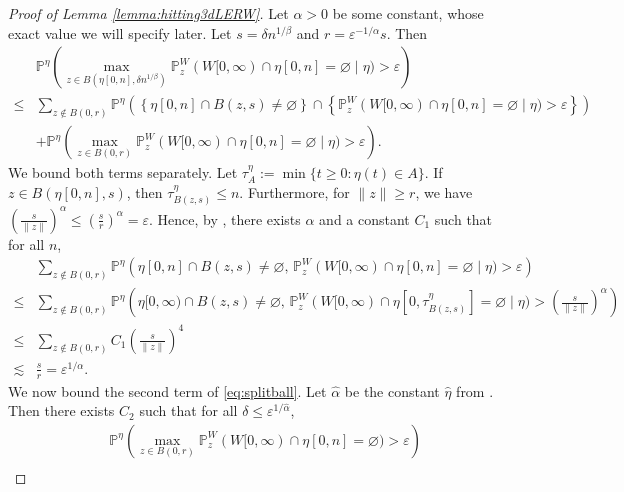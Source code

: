 \documentclass{article}
\renewcommand{\P}{\mathbb{P}}
\newcommand{\1}{\mathbf{1}}
\theoremstyle{definition}
\numberwithin{equation}{section}
\numberwithin{theorem}{section}
\begin{document}
\begin{proof}[Proof of Lemma \ref{lemma:hitting3dLERW}]
Let $\alpha>0$ be some constant, whose exact value we will specify later. Let $s=\delta n^{1/\beta}$ and $r=\varepsilon^{-1/\alpha}s$. Then
\begin{equation}\label{eq:splitball}
    \begin{split}
        &\P^\eta\left(\max_{z\in B(\eta[0,n],\delta n^{1/\beta})}\P^W_z(W[0,\infty)\cap \eta[0,n]=\varnothing\mid \eta)>\varepsilon\right)\\
        \leq&\sum_{z\not\in B(0,r)}\P^\eta\left(\left\{\eta[0,n]\cap B(z,s)\neq\varnothing\right\}\cap\left\{\P^W_z(W[0,\infty)\cap \eta[0,n]=\varnothing\mid \eta)>\varepsilon\right\}\right)\\
        &+\P^\eta\left(\max_{z\in B(0,r)}\P^W_z(W[0,\infty)\cap \eta[0,n]=\varnothing\mid \eta)>\varepsilon\right).
    \end{split}
\end{equation}
We bound both terms separately. Let $\tau^\eta_A:=\min\{t\geq0\colon \eta(t)\in A\}$. If $z\in B(\eta[0,n],s)$, then $\tau^\eta_{B(z,s)}\leq n$. Furthermore, for $\|z\|\geq r$, we have $(\frac{s}{\|z\|})^{\alpha}\leq(\frac{s}{r})^{\alpha}=\varepsilon$. Hence, by \cite[Lemma 3.3]{sapozhnikov18brownian}, there exists $\alpha$ and a constant $C_1$ such that for all $n$,
\begin{equation}\label{eq:firstterm}
    \begin{split}
        &\sum_{z\not\in B(0,r)}\P^\eta\left(\eta[0,n]\cap B(z,s)\neq\varnothing,\,\P^W_z(W[0,\infty)\cap \eta[0,n]=\varnothing\mid \eta)>\varepsilon\right)\\
        \leq&\sum_{z\not\in B(0,r)}\P^\eta\left(\eta[0,\infty)\cap B(z,s)\neq\varnothing,\,\P^W_z(W[0,\infty)\cap \eta[0,\tau^{\eta}_{B(z,s)}]=\varnothing\mid \eta)>(\tfrac{s}{\|z\|})^{\alpha}\right)\\
        \leq&\sum_{z\not\in B(0,r)} C_1\left(\frac{s}{\|z\|}\right)^{4}\\
        \lesssim&\frac{s}{r}=\varepsilon^{1/\alpha}.
    \end{split}
\end{equation}
We now bound the second term of \eqref{eq:splitball}. Let $\hat{\alpha}$ be the constant $\hat\eta$ from \cite[Proposition 3.7]{angel21scaling}. Then there exists $C_2$ such that for all $\delta\leq\varepsilon^{1/\hat\alpha}$,
\begin{equation}
    \begin{split}
        &\P^{\eta}\left(\max_{z\in B(0,r)}\P_z^W(W[0,\infty)\cap\eta[0,n]=\varnothing)>\varepsilon\right)\\

\end{split}
\end{equation}
\end{proof}
\end{document}
